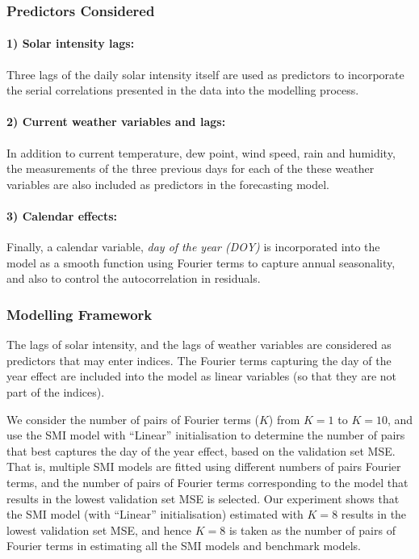 \documentclass[
  11pt,
  a4paper,
]{article}
\begin{document}
\subsubsection{Predictors Considered}\label{predictors-considered-1}

\paragraph{1) Solar intensity lags:}\label{solar-intensity-lags}

Three lags of the daily solar intensity itself are used as predictors to
incorporate the serial correlations presented in the data into the
modelling process.

\paragraph{2) Current weather variables and
lags:}\label{current-weather-variables-and-lags}

In addition to current temperature, dew point, wind speed, rain and
humidity, the measurements of the three previous days for each of the
these weather variables are also included as predictors in the
forecasting model.

\paragraph{3) Calendar effects:}\label{calendar-effects-1}

Finally, a calendar variable, \emph{day of the year (DOY)} is
incorporated into the model as a smooth function using Fourier terms to
capture annual seasonality, and also to control the autocorrelation in
residuals.

\subsubsection{Modelling Framework}\label{modelling-framework-1}

The lags of solar intensity, and the lags of weather variables are
considered as predictors that may enter indices. The Fourier terms
capturing the day of the year effect are included into the model as
linear variables (so that they are not part of the indices).

We consider the number of pairs of Fourier terms (\(K\)) from \(K = 1\)
to \(K = 10\), and use the SMI model with ``Linear'' initialisation to
determine the number of pairs that best captures the day of the year
effect, based on the validation set MSE. That is, multiple SMI models
are fitted using different numbers of pairs Fourier terms, and the
number of pairs of Fourier terms corresponding to the model that results
in the lowest validation set MSE is selected. Our experiment shows that
the SMI model (with ``Linear'' initialisation) estimated with \(K = 8\)
results in the lowest validation set MSE, and hence \(K = 8\) is taken
as the number of pairs of Fourier terms in estimating all the SMI models
and benchmark models.
\end{document}
